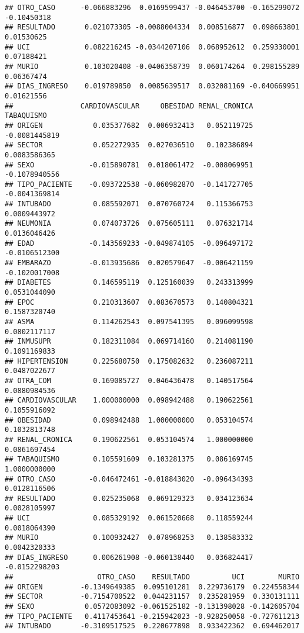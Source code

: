 \documentclass[]{article}
\begin{document}
\begin{verbatim}
## OTRO_CASO      -0.066883296  0.0169599437 -0.046453700 -0.165299072 -0.10450318
## RESULTADO       0.021073305 -0.0088004334  0.008516877  0.098663801  0.01530625
## UCI             0.082216245 -0.0344207106  0.068952612  0.259330001  0.07188421
## MURIO           0.103020408 -0.0406358739  0.060174264  0.298155289  0.06367474
## DIAS_INGRESO    0.019789850  0.0085639517  0.032081169 -0.040669951  0.01621556
##                CARDIOVASCULAR     OBESIDAD RENAL_CRONICA    TABAQUISMO
## ORIGEN            0.035377682  0.006932413   0.052119725 -0.0081445819
## SECTOR            0.052272935  0.027036510   0.102386894  0.0083586365
## SEXO             -0.015890781  0.018061472  -0.008069951 -0.1078940556
## TIPO_PACIENTE    -0.093722538 -0.060982870  -0.141727705 -0.0041369814
## INTUBADO          0.085592071  0.070760724   0.115366753  0.0009443972
## NEUMONIA          0.074073726  0.075605111   0.076321714  0.0136046426
## EDAD             -0.143569233 -0.049874105  -0.096497172 -0.0106512300
## EMBARAZO         -0.013935686  0.020579647  -0.006421159 -0.1020017008
## DIABETES          0.146595119  0.125160039   0.243313999  0.0531044090
## EPOC              0.210313607  0.083670573   0.140804321  0.1587320740
## ASMA              0.114262543  0.097541395   0.096099598  0.0802117117
## INMUSUPR          0.182311084  0.069714160   0.214081190  0.1091169833
## HIPERTENSION      0.225680750  0.175082632   0.236087211  0.0487022677
## OTRA_COM          0.169085727  0.046436478   0.140517564  0.0880984536
## CARDIOVASCULAR    1.000000000  0.098942488   0.190622561  0.1055916092
## OBESIDAD          0.098942488  1.000000000   0.053104574  0.1032813748
## RENAL_CRONICA     0.190622561  0.053104574   1.000000000  0.0861697454
## TABAQUISMO        0.105591609  0.103281375   0.086169745  1.0000000000
## OTRO_CASO        -0.046472461 -0.018843020  -0.096434393  0.0128116506
## RESULTADO         0.025235068  0.069129323   0.034123634  0.0028105997
## UCI               0.085329192  0.061520668   0.118559244  0.0018064390
## MURIO             0.100932427  0.078968253   0.138583332  0.0042320333
## DIAS_INGRESO      0.006261908 -0.060138440   0.036824417 -0.0152298203
##                    OTRO_CASO    RESULTADO          UCI        MURIO
## ORIGEN         -0.1349649385  0.095101281  0.229736179  0.224558344
## SECTOR         -0.7154700522  0.044231157  0.235281959  0.330131111
## SEXO            0.0572083092 -0.061525182 -0.131398028 -0.142605704
## TIPO_PACIENTE   0.4117453641 -0.215942023 -0.928250058 -0.727611213
## INTUBADO       -0.3109517525  0.220677898  0.933422362  0.694462017

\end{verbatim}
\end{document}
